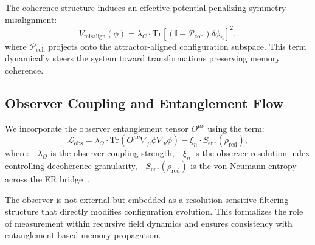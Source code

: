 The coherence structure induces an effective potential penalizing symmetry misalignment:
\[
V_{\text{misalign}}(\phi) = \lambda_C \cdot \mathrm{Tr} \left[ \left( \mathbb{I} - \mathcal{P}_{\text{coh}} \right) \delta \phi_n \right]^2,
\]
where $\mathcal{P}_{\text{coh}}$ projects onto the attractor-aligned configuration subspace. This term dynamically steers the system toward transformations preserving memory coherence.

\subsection{Observer Coupling and Entanglement Flow}

We incorporate the observer entanglement tensor $O^{\mu\nu}$ using the term:
\[
\mathcal{L}_{\text{obs}} = \lambda_O \cdot \mathrm{Tr} \left( O^{\mu\nu} \nabla_\mu \phi \nabla_\nu \phi \right) - \xi_n \cdot S_{\text{ent}}(\rho_{\text{red}}),
\]
where:
- $\lambda_O$ is the observer coupling strength,
- $\xi_n$ is the observer resolution index controlling decoherence granularity,
- $S_{\text{ent}}(\rho_{\text{red}})$ is the von Neumann entropy across the ER bridge~\cite{maldacena2013cool}.

The observer is not external but embedded as a resolution-sensitive filtering structure that directly modifies configuration evolution. This formalizes the role of measurement within recursive field dynamics and ensures consistency with entanglement-based memory propagation.
